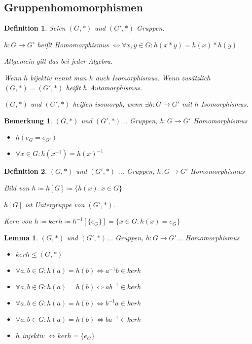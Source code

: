 \documentclass[twocolumn]{article}
\newtheorem{lemma}[theorem]{Lemma}
\newtheorem{definition}{Definition}[section]
\newtheorem*{remark}{Bemerkung}
\newcommand*{\logeq}{\Leftrightarrow}
\begin{document}
\subsection{Gruppenhomomorphismen}

\begin{definition}
	Seien $(G,*)$ und $(G',*)$ Gruppen.
	
	$h:G\rightarrow G'$ heißt Homomorphismus $\logeq \forall x,y \in G : h(x*y)=h(x)*h(y)$
	
	Allgemein gilt das bei jeder Algebra.
	
	Wenn $h$ bijektiv nennt man $h$ auch Isomorphismus. Wenn zusätzlich $(G,*) = (G',*)$ heißt $h$ Automorphismus.
	
	$(G,*)$ und $(G',*)$ heißen isomorph, wenn $\exists h:G\rightarrow G'$ mit $h$ Isomorphismus.
\end{definition}

\begin{remark}
	$(G,*)$ und $(G',*)$... Gruppen, $h:G\rightarrow G'$ Homomorphismus
	
	\begin{itemize}
		\item $h(e_{G}=e_{G'})$
		\item $\forall x \in G : h(x^{-1})=h(x)^{-1}$
	\end{itemize}
\end{remark}

\begin{definition}
	$(G,*)$ und $(G',*)$ ... Gruppen, $h:G\rightarrow G'$ Homomorphismus
	
	Bild von $h \coloneqq h[G]\coloneqq \{h(x):x\in G\}$
	
	$h[G]$ ist Untergruppe von $(G',*)$.
	
	Kern von $h \coloneqq ker h \coloneqq h^{-1}[\{e_{G}\}]=\{x \in G : h(x) = e_{G}\}$
\end{definition}

\begin{lemma}
	$(G,*)$ und $(G',*)$... Gruppen, $h:G\rightarrow G'$... Homomorphismus
	
	\begin{itemize}
		\item $kerh \leq (G,*)$
		\item $\forall a,b \in G:h(a)=h(b)\logeq a^{-1}b \in kerh$
		\item $\forall a,b \in G:h(a)=h(b)\logeq ab^{-1} \in kerh$
		\item $\forall a,b \in G:h(a)=h(b)\logeq b^{-1}a \in kerh$
		\item $\forall a,b \in G:h(a)=h(b)\logeq ba^{-1} \in kerh$
		\item $h$ injektiv $\logeq kerh=\{e_{G}\}$
	\end{itemize}
\end{lemma}
\end{document}
